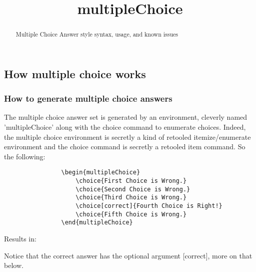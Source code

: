 \documentclass{ximera}
\title{multipleChoice}
\begin{document}
\begin{abstract}
    Multiple Choice Answer style syntax, usage, and known issues 
\end{abstract}
\maketitle

    \subsection*{How multiple choice works}
    
    
        \subsubsection*{How to generate multiple choice answers}
        
            The multiple choice answer set is generated by an environment, cleverly named 'multipleChoice' along with the choice command to enumerate choices. Indeed, the multiple choice environment is secretly a kind of retooled itemize/enumerate environment and the choice command is secretly a retooled item command. So the following:
            \begin{verbatim}
                \begin{multipleChoice}
                    \choice{First Choice is Wrong.}
                    \choice{Second Choice is Wrong.}
                    \choice{Third Choice is Wrong.}
                    \choice[correct]{Fourth Choice is Right!}
                    \choice{Fifth Choice is Wrong.}
                \end{multipleChoice}
            \end{verbatim}
            Results in:
            \begin{multipleChoice}
            \end{multipleChoice}
            
            Notice that the correct answer has the optional argument [correct], more on that below.
            
\end{document}
